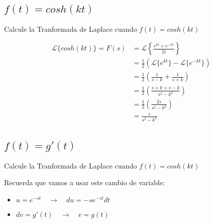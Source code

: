 \documentclass[12pt]{report}                                    %
\begin{document}
        \subsection{$f(t) = cosh(kt)$}
            Calcule la Tranformada de Laplace cuando $f(t) = cosh(kt)$

            \begin{equation*}   
            \begin{split}
                \mathscr{L}\{cosh(kt)\}
                    = F(s) & = \mathscr{L}\left\{ \frac{e^{kt} + e^{-kt}}{2i} \right\}             \\
                    & = \frac{1}{2} \left(\mathscr{L}\{e^{kt}\}-\mathscr{L}\{e^{-kt}\}\right)      \\
                    & = \frac{1}{2} \left( \frac{1}{s-k} + \frac{1}{s+k} \right)                   \\
                    & = \frac{1}{2} \left( \frac{s+k+s-k}{s^2-k^2} \right)                         \\
                    & = \frac{1}{2} \left( \frac{2s}{s^2-k^2} \right)                              \\
                    & = \frac{s}{s^2-k^2}                                                          \\
            \end{split}
            \end{equation*}


        \clearpage
        \subsection{$f(t) = g'(t)$}
            Calcule la Tranformada de Laplace cuando $f(t) = cosh(kt)$

            Recuerda que vamos a usar este cambio de variable:
            \begin{itemize}
                \item $u=e^{-st} \quad \to \quad du=-se^{-st}dt$
                \item $dv=g'(t)  \quad \to \quad v =g(t)$ 
            \end{itemize}
\end{document}
